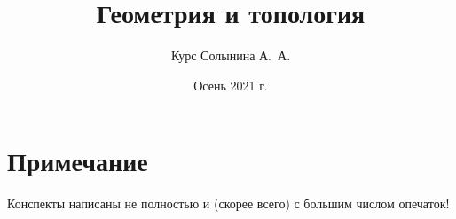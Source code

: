 \documentclass[12pt, a4paper, oneside]{memoir}
\title{Геометрия и топология}
\author{Курс Солынина А.~А.}
\date{Осень 2021 г.}
\begin{document}
\frontmatter

\begin{titlingpage}
    \maketitle
\end{titlingpage}

\section*{Примечание}
Конспекты написаны не полностью и (скорее всего) с большим числом опечаток!
\pagebreak

\tableofcontents
{}



\mainmatter
















\end{document}
